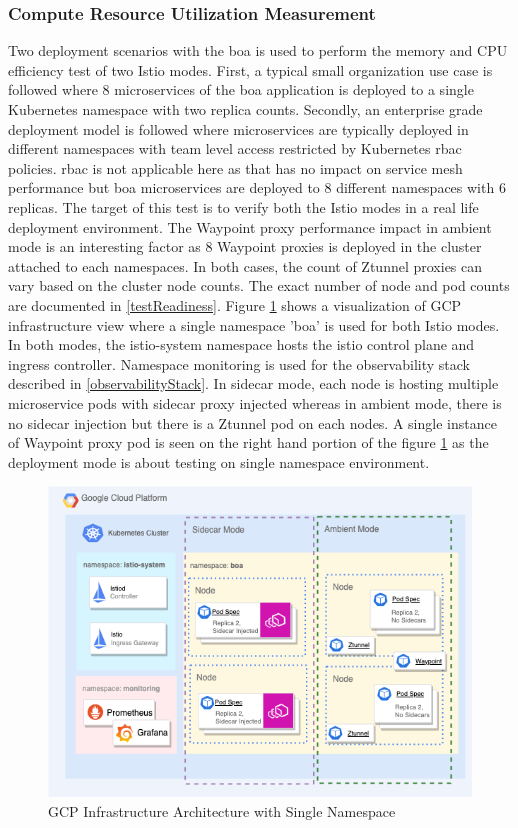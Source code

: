 \subsubsection{Compute Resource Utilization Measurement}
Two deployment scenarios with the \acrshort{boa} is used to perform the memory and CPU efficiency test of two Istio modes. First, a typical small organization use case is followed where 8 microservices of the \acrshort{boa} application is deployed to a single Kubernetes namespace with two replica counts. Secondly, an enterprise grade deployment model is followed where microservices are typically deployed in different namespaces with team level access restricted by Kubernetes \acrlong{rbac} policies. \acrshort{rbac} is not applicable here as that has no impact on service mesh performance but  \acrshort{boa} microservices are deployed to 8 different namespaces with 6 replicas. The target of this test is to verify both the Istio modes in a real life deployment environment. The Waypoint proxy performance impact in ambient mode is an interesting factor as 8 Waypoint proxies is deployed in the cluster attached to each namespaces. In both cases, the count of Ztunnel proxies can vary based on the cluster node counts. The exact number of node and pod counts are documented in \ref{testReadiness}. Figure \ref{method:singleNsInfraArch} shows a visualization of GCP infrastructure view where a single namespace 'boa' is used for both Istio modes. In both modes, the istio-system namespace hosts the istio control plane and ingress controller. Namespace monitoring is used for the observability stack described in \ref{observabilityStack}. In sidecar mode, each node is hosting multiple microservice pods with sidecar proxy injected whereas in ambient mode, there is no sidecar injection but there is a Ztunnel pod on each nodes. A single instance of Waypoint proxy pod is seen on the right hand portion of the figure \ref{method:singleNsInfraArch} as the deployment mode is about testing on single namespace environment.

\begin{figure}[ht!]
    \centering
    \includegraphics[width=1.0\linewidth]{resources/single-ns-test-infra.drawio.png}
    \caption{GCP Infrastructure Architecture with Single Namespace}
    \label{method:singleNsInfraArch}
\end{figure}

